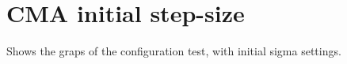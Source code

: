 \section{CMA initial step-size \label{appendixCMAInitialSigma}}

Shows the graps of the configuration test, with initial sigma
settings.

